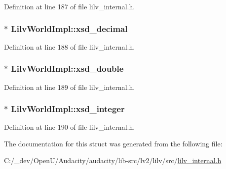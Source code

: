 Definition at line 187 of file lilv\+\_\+internal.\+h.

\subsubsection[{\texorpdfstring{xsd\+\_\+decimal}{xsd_decimal}}]{$\ast$ Lilv\+World\+Impl\+::xsd\+\_\+decimal}\hypertarget{struct_lilv_world_impl_a454e1ec6c712b8fcd8b7719f7eac49eb}{}\label{struct_lilv_world_impl_a454e1ec6c712b8fcd8b7719f7eac49eb}


Definition at line 188 of file lilv\+\_\+internal.\+h.

\subsubsection[{\texorpdfstring{xsd\+\_\+double}{xsd_double}}]{$\ast$ Lilv\+World\+Impl\+::xsd\+\_\+double}\hypertarget{struct_lilv_world_impl_adac47200cd8df990860ce15fbe7a03e5}{}\label{struct_lilv_world_impl_adac47200cd8df990860ce15fbe7a03e5}


Definition at line 189 of file lilv\+\_\+internal.\+h.

\subsubsection[{\texorpdfstring{xsd\+\_\+integer}{xsd_integer}}]{$\ast$ Lilv\+World\+Impl\+::xsd\+\_\+integer}\hypertarget{struct_lilv_world_impl_a514c88eb691e7568e3c4d758214cf492}{}\label{struct_lilv_world_impl_a514c88eb691e7568e3c4d758214cf492}


Definition at line 190 of file lilv\+\_\+internal.\+h.



The documentation for this struct was generated from the following file\+:\begin{DoxyCompactItemize}
\item 
C\+:/\+\_\+dev/\+Open\+U/\+Audacity/audacity/lib-\/src/lv2/lilv/src/\hyperlink{lilv__internal_8h}{lilv\+\_\+internal.\+h}\end{DoxyCompactItemize}
